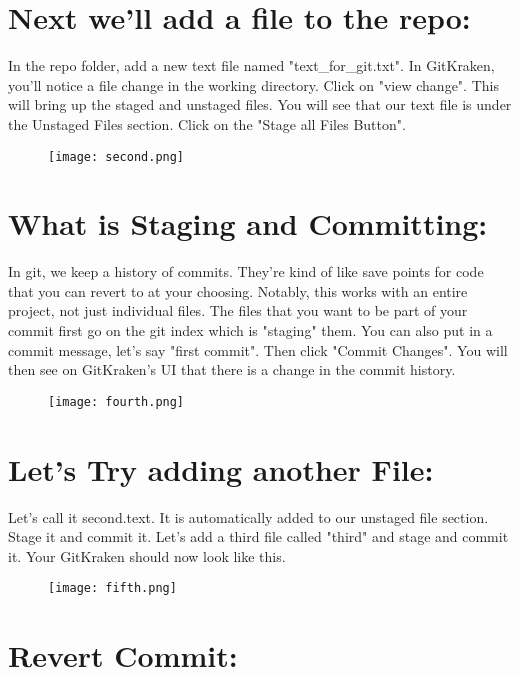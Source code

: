 \documentclass[10pt,twocolumn]{article}
\begin{document}
\section{Next we'll add a file to the repo:}

In the repo folder, add a new text file named "text\_for\_git.txt". In GitKraken, you'll notice a file change in the working directory. Click on "view change". This will bring up the staged and unstaged files. You will see that our text file is under the Unstaged Files section. Click on the "Stage all Files Button".

\begin{figure}[htbp]
\centering
\texttt{[image: second.png]}
\label{fig:my_label}
\end{figure}

\section{What is Staging and Committing:}

In git, we keep a history of commits. They're kind of like save points for code that you can revert to at your choosing. Notably, this works with an entire project, not just individual files. The files that you want to be part of your commit first go on the git index which is "staging" them. You can also put in a commit message, let's say "first commit". Then click "Commit Changes". You will then see on GitKraken's UI that there is a change in the commit history.

\begin{figure}[htbp]
\centering
\texttt{[image: fourth.png]}
\label{fig:my_label}
\end{figure}

\section{Let's Try adding another File:}

Let's call it second.text. It is automatically added to our unstaged file section. Stage it and commit it. Let's add a third file called "third" and stage and commit it. Your GitKraken should now look like this.

\begin{figure}[htbp]
\centering
\texttt{[image: fifth.png]}
\label{fig:my_label}
\end{figure}

\section{Revert Commit:}
\end{document}
